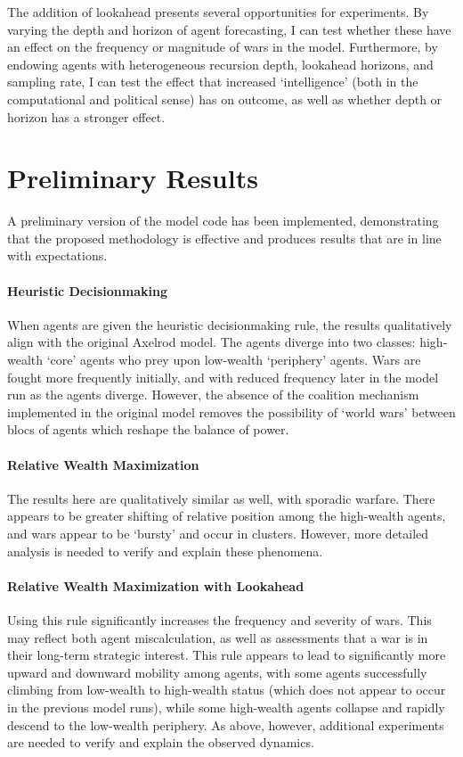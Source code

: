 \documentclass{article}
\begin{document}
The addition of lookahead presents several opportunities for experiments. By varying the depth and horizon of agent forecasting, I can test whether these have an effect on the frequency or magnitude of wars in the model. Furthermore, by endowing agents with heterogeneous recursion depth, lookahead horizons, and sampling rate, I can test the effect that increased `intelligence' (both in the computational and political sense) has on outcome, as well as whether depth or horizon has a stronger effect. 

\section{Preliminary Results}

A preliminary version of the model code has been implemented, demonstrating that the proposed methodology is effective and produces results that are in line with expectations.

\paragraph{Heuristic Decisionmaking}
When agents are given the heuristic decisionmaking rule, the results qualitatively align with the original Axelrod model. The agents diverge into two classes: high-wealth `core' agents who prey upon low-wealth `periphery' agents. Wars are fought more frequently initially, and with reduced frequency later in the model run as the agents diverge. However, the absence of the coalition mechanism implemented in the original model removes the possibility of `world wars' between blocs of agents which reshape the balance of power.

\paragraph{Relative Wealth Maximization}

The results here are qualitatively similar as well, with sporadic warfare. There appears to be greater shifting of relative position among the high-wealth agents, and wars appear to be `bursty' and occur in clusters. However, more detailed analysis is needed to verify and explain these phenomena.

\paragraph{Relative Wealth Maximization with Lookahead}

Using this rule significantly increases the frequency and severity of wars. This may reflect both agent miscalculation, as well as assessments that a war is in their long-term strategic interest. This rule appears to lead to significantly more upward and downward mobility among agents, with some agents successfully climbing from low-wealth to high-wealth status (which does not appear to occur in the previous model runs), while some high-wealth agents collapse and rapidly descend to the low-wealth periphery. As above, however, additional experiments are needed to verify and explain the observed dynamics.
\end{document}
